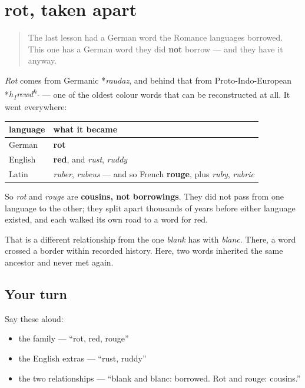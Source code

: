 \section[rot, red, rouge]{rot, taken apart}

\label{lesson:GE-C13-rot-ruber}



\begin{quote}
The last lesson had a German word the Romance languages borrowed. This one has a German word they did \textbf{not} borrow — and they have it anyway.
\end{quote}

\begin{cousinweb}
\emph{Rot} comes from Germanic *\emph{raudaz}, and behind that from Proto-Indo-European *\emph{h\textsubscript{1}rewd\textsuperscript{h}-} — one of the oldest colour words that can be reconstructed at all. It went everywhere:

\noindent
\begin{tabularx}{\linewidth}{@{}>{\raggedright\arraybackslash}X>{\raggedright\arraybackslash}X@{}}
\toprule
\textbf{language} & \textbf{what it became} \\
\midrule
German & \textbf{rot} \\
English & \textbf{red}, and \emph{rust}, \emph{ruddy} \\
Latin & \emph{ruber}, \emph{rubeus} — and so French \textbf{rouge}, plus \emph{ruby}, \emph{rubric} \\
\bottomrule
\end{tabularx}

So \emph{rot} and \emph{rouge} are \textbf{cousins, not borrowings}. They did not pass from one language to the other; they split apart thousands of years before either language existed, and each walked its own road to a word for red.

That is a different relationship from the one \emph{blank} has with \emph{blanc}. There, a word crossed a border within recorded history. Here, two words inherited the same ancestor and never met again.
\end{cousinweb}

\subsection*{Your turn}
Say these aloud:

\begin{itemize}
\raggedright
  \item the family — \textquotedblleft{}rot, red, rouge\textquotedblright{}
  \item the English extras — \textquotedblleft{}rust, ruddy\textquotedblright{}
  \item the two relationships — \textquotedblleft{}blank and blanc: borrowed. Rot and rouge: cousins.\textquotedblright{}
\end{itemize}

